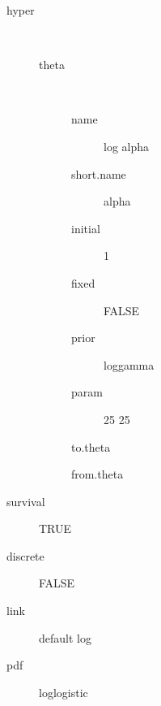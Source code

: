 \begin{description}
	\item[hyper]\ 
	 \begin{description}
	 	\item[theta]\ 
	 	 \begin{description}
	 	 	 \item[ name ] log alpha 
	 	 	 \item[ short.name ] alpha 
	 	 	 \item[ initial ] 1 
	 	 	 \item[ fixed ] FALSE 
	 	 	 \item[ prior ] loggamma 
	 	 	 \item[ param ] 25 25 
	 	 	 \item[ to.theta ] \verb|| 
	 	 	 \item[ from.theta ] \verb|| 
	 	 \end{description}
	 \end{description}
	 \item[ survival ] TRUE 
	 \item[ discrete ] FALSE 
	 \item[ link ] default log 
	 \item[ pdf ] loglogistic 
\end{description}

